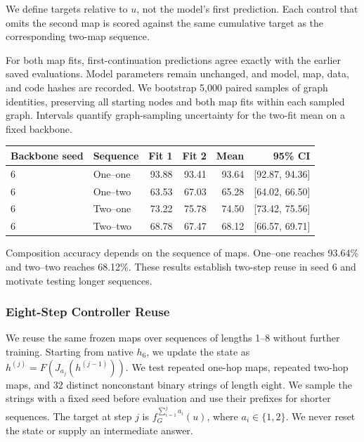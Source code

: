 \documentclass{article}
\begin{document}
We define targets relative to $u$, not the model's first prediction. Each control that omits the second map is scored against the same cumulative target as the corresponding two-map sequence.

For both map fits, first-continuation predictions agree exactly with the earlier saved evaluations. Model parameters remain unchanged, and model, map, data, and code hashes are recorded. We bootstrap 5,000 paired samples of graph identities, preserving all starting nodes and both map fits within each sampled graph. Intervals quantify graph-sampling uncertainty for the two-fit mean on a fixed backbone.

\begin{center}\begin{minipage}{\linewidth}\centering
\captionsetup{hypcap=false}
\begin{tabular}{@{}llrrrr@{}}\toprule
Backbone seed & Sequence & Fit 1 & Fit 2 & Mean & 95\% CI\\\midrule
6 & One--one & 93.88 & 93.41 & 93.64 & [92.87, 94.36]\\
6 & One--two & 63.53 & 67.03 & 65.28 & [64.02, 66.50]\\
6 & Two--one & 73.22 & 75.78 & 74.50 & [73.42, 75.56]\\
6 & Two--two & 68.78 & 67.47 & 68.12 & [66.57, 69.71]\\
\bottomrule\end{tabular}\end{minipage}\end{center}

Composition accuracy depends on the sequence of maps. One--one reaches 93.64\% and two--two reaches 68.12\%. These results establish two-step reuse in seed 6 and motivate testing longer sequences.

\subsubsection{Eight-Step Controller Reuse}
\label{app:long-composition}

We reuse the same frozen maps over sequences of lengths 1--8 without further training. Starting from native $h_6$, we update the state as $h^{(j)}=F(J_{a_j}(h^{(j-1)}))$. We test repeated one-hop maps, repeated two-hop maps, and 32 distinct nonconstant binary strings of length eight. We sample the strings with a fixed seed before evaluation and use their prefixes for shorter sequences. The target at step $j$ is $f_G^{\sum_{i=1}^j a_i}(u)$, where $a_i\in\{1,2\}$. We never reset the state or supply an intermediate answer.
\end{document}
